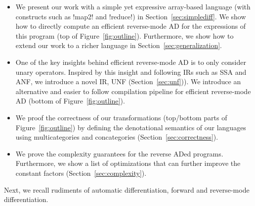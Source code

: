 \begin{itemize}[leftmargin=*]
\item We present our work with a simple yet expressive array-based language (with constructs such as !map2! and !reduce!) in Section~\ref{sec:simplediff}. 
We show how to directly compute an efficient reverse-mode AD for the expressions of this program (top of Figure~\ref{fig:outline}).  
Furthermore, we show how to extend our work to a richer language in Section~\ref{sec:generalization}.
\item One of the key insights behind efficient reverse-mode AD is to only consider unary operators. 
Inspired by this insight and following IRs such as SSA and ANF, we introduce a novel IR, UNF (Section~\ref{sec:unf})).
We introduce an alternative and easier to follow compilation pipeline for efficient reverse-mode AD (bottom of Figure~\ref{fig:outline}).
\item We proof the correctness of our transformations (top/bottom parts of Figure~\ref{fig:outline}) by defining the denotational semantics of our languages using multicategories and concategories (Section~\ref{sec:correctness}).
\item We prove the complexity guarantees for the reverse ADed programs. Furthermore, we show a list of optimizations that can further improve the constant factors (Section~\ref{sec:complexity}).
\end{itemize}

Next, we recall rudiments of automatic differentiation, forward and reverse-mode differentiation.




